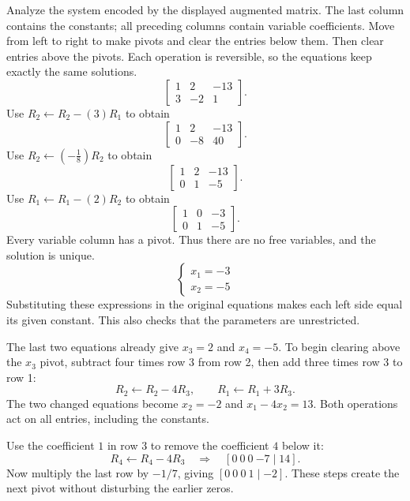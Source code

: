 \goal Analyze the system encoded by the displayed augmented matrix. The last column contains the constants; all preceding columns contain variable coefficients.
\idea Move from left to right to make pivots and clear the entries below them. Then clear entries above the pivots. Each operation is reversible, so the equations keep exactly the same solutions.
\[ \left[\begin{array}{rr|r}1&2&-13\\3&-2&1\end{array}\right].\]
Use $R_{2}\leftarrow R_{2}-(3)R_{1}$ to obtain
\[ \left[\begin{array}{rr|r}1&2&-13\\0&-8&40\end{array}\right].\]
Use $R_{2}\leftarrow(- \frac{1}{8})R_{2}$ to obtain
\[ \left[\begin{array}{rr|r}1&2&-13\\0&1&-5\end{array}\right].\]
Use $R_{1}\leftarrow R_{1}-(2)R_{2}$ to obtain
\[ \left[\begin{array}{rr|r}1&0&-3\\0&1&-5\end{array}\right].\]
Every variable column has a pivot. Thus there are no free variables, and the solution is unique.
\[ \begin{cases}x_{1}=-3\\x_{2}=-5\end{cases}\]
Substituting these expressions in the original equations makes each left side equal its given constant. This also checks that the parameters are unrestricted.

The last two equations already give $x_3=2$ and $x_4=-5$.
To begin clearing above the $x_3$ pivot, subtract four times row 3 from
row 2, then add three times row 3 to row 1:
\[
 R_2\leftarrow R_2-4R_3,\qquad R_1\leftarrow R_1+3R_3.
\]
The two changed equations become $x_2=-2$ and $x_1-4x_2=13$.
Both operations act on all entries, including the constants.

Use the coefficient $1$ in row 3 to remove the coefficient $4$ below it:
\[
 R_4\leftarrow R_4-4R_3\quad\Longrightarrow\quad
 [0\ 0\ 0\ {-7}\mid14].
\]
Now multiply the last row by $-1/7$, giving $[0\ 0\ 0\ 1\mid-2]$.
These steps create the next pivot without disturbing the earlier zeros.

